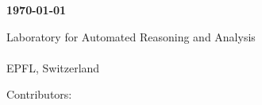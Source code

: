 \begin{titlepage}
  \sf

  \begin{center}
    \vspace*{1cm}

    \textbf{\Huge \ourtitle}

    \vspace{1.5cm}


    \textbf{\large \today}

    \vspace{1.5cm}

    {\Large Laboratory for Automated Reasoning and Analysis \\ \ \\ EPFL, Switzerland}

    \vspace{1.5cm}

    \date{}

  \end{center}

  \vfill

  Contributors:
  \begin{flushright}
    \large
    \ournames
  \end{flushright}

\end{titlepage}
